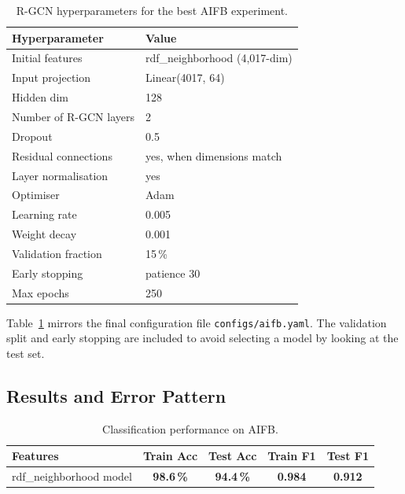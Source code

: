 \documentclass[runningheads]{llncs}
\begin{document}
\begin{table}[ht]
\centering
\caption{R-GCN hyperparameters for the best AIFB experiment.}
\label{tab:hyperparams}
\begin{tabular}{ll}
\toprule
\textbf{Hyperparameter} & \textbf{Value} \\
\midrule
Initial features     & rdf\_neighborhood (4,017-dim) \\
Input projection     & Linear(4017, 64) \\
Hidden dim           & 128 \\
Number of R-GCN layers & 2 \\
Dropout              & 0.5 \\
Residual connections & yes, when dimensions match \\
Layer normalisation  & yes \\
Optimiser            & Adam \\
Learning rate        & 0.005 \\
Weight decay         & 0.001 \\
Validation fraction  & 15\,\% \\
Early stopping       & patience 30 \\
Max epochs           & 250 \\
\bottomrule
\end{tabular}
\end{table}

Table~\ref{tab:hyperparams} mirrors the final configuration file \texttt{configs/aifb.yaml}.  The validation
split and early stopping are included to avoid selecting a model by looking at the test set.

\subsection{Results and Error Pattern}

\begin{table}[ht]
\centering
\caption{Classification performance on AIFB.}
\label{tab:results}
\begin{tabular}{lcccc}
\toprule
\textbf{Features} & \textbf{Train Acc} & \textbf{Test Acc} & \textbf{Train F1} & \textbf{Test F1} \\
\midrule
rdf\_neighborhood model  & \textbf{98.6\,\%} & \textbf{94.4\,\%} & \textbf{0.984} & \textbf{0.912} \\
\bottomrule
\end{tabular}
\end{table}
\end{document}
